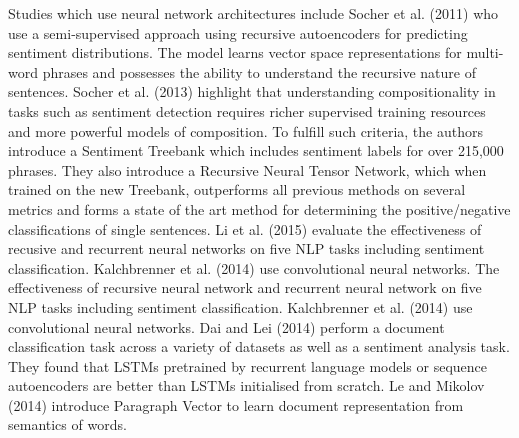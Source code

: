 \documentclass[conference]{IEEEtran}
\begin{document}
Studies which use neural network architectures include Socher et al. (2011) who use a semi-supervised approach using recursive autoencoders for predicting sentiment distributions. The model learns vector space representations for multi-word phrases and possesses the ability to understand the recursive nature of sentences. Socher et al. (2013) highlight that understanding compositionality in tasks such as sentiment detection requires richer supervised training resources and more powerful models of composition. To fulfill such criteria, the authors introduce a Sentiment Treebank which includes sentiment labels for over 215,000 phrases. They also introduce a Recursive Neural Tensor Network, which when trained on the new Treebank, outperforms all previous methods on several metrics and forms a state of the art method for determining the positive/negative classifications of single sentences. Li et al. (2015) evaluate the effectiveness of recusive and recurrent neural networks on five NLP tasks including sentiment classification. Kalchbrenner et al. (2014) use convolutional neural networks. The effectiveness of recursive neural network and recurrent neural network on five NLP tasks including sentiment classification. Kalchbrenner et al. (2014) use convolutional neural networks. Dai and Lei (2014) perform a document classification task across a variety of datasets as well as a sentiment analysis task. They found that LSTMs pretrained by recurrent language models or sequence autoencoders are better than LSTMs initialised from scratch. Le and Mikolov (2014) introduce Paragraph Vector to learn document representation from semantics of words.
\end{document}
